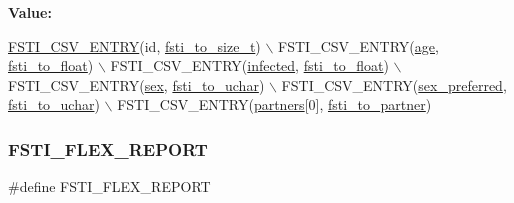 {\bfseries Value\+:}
\begin{DoxyCode}
\mbox{\hyperlink{fsti-defs_8h_a2f02b006df671555a32425a13bb1a22e}{FSTI\_CSV\_ENTRY}}(\textcolor{keywordtype}{id}, \mbox{\hyperlink{fsti-events_8c_ace7211e8e83bb5273066bc5fe50585a6}{fsti\_to\_size\_t}})                          \(\backslash\)
    FSTI\_CSV\_ENTRY(\mbox{\hyperlink{structfsti__agent_a44c237039bb02720a770b625f905cf76}{age}}, \mbox{\hyperlink{fsti-events_8c_af4a768af0f5d827f7b40da95c29879da}{fsti\_to\_float}})                          \(\backslash\)
    FSTI\_CSV\_ENTRY(\mbox{\hyperlink{structfsti__agent_ae726e3b1cb42878ef3ca3148fe597a56}{infected}}, \mbox{\hyperlink{fsti-events_8c_af4a768af0f5d827f7b40da95c29879da}{fsti\_to\_float}})                     \(\backslash\)
    FSTI\_CSV\_ENTRY(\mbox{\hyperlink{structfsti__agent_a81efd8aa28057dcf6fcee094eff29738}{sex}}, \mbox{\hyperlink{fsti-events_8c_aad3a0605b88803863e016f9409df45ba}{fsti\_to\_uchar}})                          \(\backslash\)
    FSTI\_CSV\_ENTRY(\mbox{\hyperlink{structfsti__agent_abd0962451cba251baf607ff0e568a2ba}{sex\_preferred}}, \mbox{\hyperlink{fsti-events_8c_aad3a0605b88803863e016f9409df45ba}{fsti\_to\_uchar}})                \(\backslash\)
    FSTI\_CSV\_ENTRY(\mbox{\hyperlink{structfsti__agent_a4ba0bd37a8c83bfdc08392a1cde56978}{partners}}[0], \mbox{\hyperlink{fsti-events_8c_aad5bd92a57743b08d6c9eb5bac33c78b}{fsti\_to\_partner}})
\end{DoxyCode}
\mbox{\label{fsti-defaults_8h_a36529309a147495750fc57470a781acf}} 
\subsubsection{\texorpdfstring{F\+S\+T\+I\+\_\+\+F\+L\+E\+X\+\_\+\+R\+E\+P\+O\+RT}{FSTI\_FLEX\_REPORT}}
{\footnotesize\ttfamily \#define F\+S\+T\+I\+\_\+\+F\+L\+E\+X\+\_\+\+R\+E\+P\+O\+RT}

